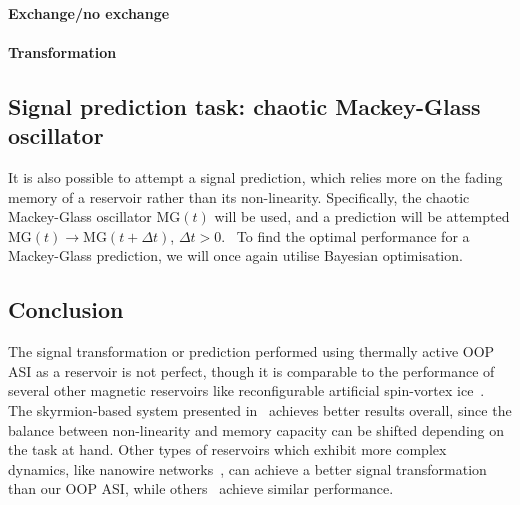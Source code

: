 \paragraph{Exchange/no exchange}
\paragraph{Transformation}
\subsection{Signal prediction task: chaotic Mackey-Glass oscillator}
It is also possible to attempt a signal prediction, which relies more on the fading memory of a reservoir rather than its non-linearity.
Specifically, the chaotic Mackey-Glass oscillator $\mathrm{MG}(t)$ will be used, and a prediction will be attempted
$\mathrm{MG}(t) \rightarrow \mathrm{MG}(t+\Delta t)$, $\Delta t > 0$.~\cite{MackeyGlass}
To find the optimal performance for a Mackey-Glass prediction, we will once again utilise Bayesian optimisation.

\subsection{Conclusion}
The signal transformation or prediction performed using thermally active OOP ASI as a reservoir is not perfect, though it is comparable to the performance of several other magnetic reservoirs like reconfigurable artificial spin-vortex ice~\cite{gartside2022reconfigurable}.
The skyrmion-based system presented in~ achieves better results overall, since the balance between non-linearity and memory capacity can be shifted depending on the task at hand.
Other types of reservoirs which exhibit more complex dynamics, like nanowire networks~\cite{RC_NNN}, can achieve a better signal transformation than our OOP ASI, while others~\cite{NanoarchitectonicAtomicSwitch} achieve similar performance.


\newpage
